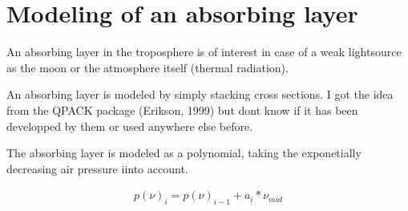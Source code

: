\documentclass{article}
\begin{document}
\section{Modeling of an absorbing layer}

An absorbing layer in the troposphere is of interest in case of a weak
lightsource as the moon or the atmosphere itself (thermal radiation). 

An absorbing layer is modeled by simply stacking cross sections. I got
the idea from the QPACK package (Erikson, 1999) but dont know if it
has been developped by them or used anywhere else before.

The absorbing layer is modeled as a polynomial, taking the
exponetially decreasing air pressure iinto account. 

\begin{eqnarray}
  p(\nu)_i = p(\nu)_{i-1} + a_i * \nu_{mid}
\end{eqnarray}
\end{document}
